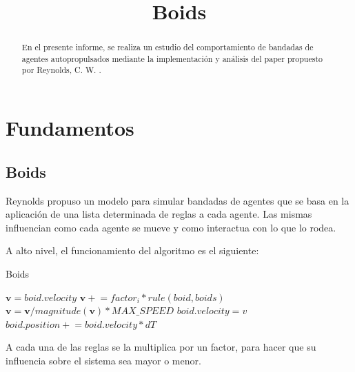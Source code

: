 \documentclass[a4paper]{article}
\title{{\centering\huge {Boids}}}
\begin{document}
\begin{titlingpage}
    \maketitle
    \begin{abstract}
        En el presente informe, se realiza un estudio del comportamiento de bandadas de agentes autopropulsados mediante la implementación y análisis del paper propuesto por Reynolds, C. W. \cite{BoidsPaper}.
    \end{abstract}
\end{titlingpage}

    \tableofcontents
    \newpage

    \section{Fundamentos}
        \subsection{Boids}
            Reynolds propuso un modelo para simular bandadas de agentes que se basa en la aplicación de una lista determinada de reglas a cada agente. Las mismas influencian como cada agente se mueve y como interactua con lo que lo rodea.

            A alto nivel, el funcionamiento del algoritmo es el siguiente:

            \begin{algorithm}
                \caption{Boids}\label{pseudo:boids}
                \begin{algorithmic}[1]
                        \State $\bm{v} = boid.velocity$
                            \State $\bm{v} \mathrel{+}= factor_i * rule(boid, boids)$
                        \EndFor
                            \State $\bm{v} = \bm{v} / magnitude(\bm{v}) * MAX\_SPEED$
                        \EndIf
                        \State $boid.velocity = v$
                        \State $boid.position \mathrel{+}= boid.velocity * dT$
                    \EndFor
                \EndProcedure
                \end{algorithmic}
            \end{algorithm}

            A cada una de las reglas se la multiplica por un factor, para hacer que su influencia sobre el sistema sea mayor o menor.
\end{document}
